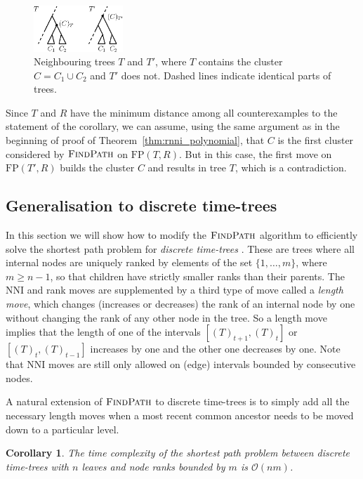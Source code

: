 \documentclass[11pt]{amsart}
\newtheorem{corollary}{Corollary}
\newcommand{\findpath}{\textsc{FindPath}}
\newcommand{\nni}{\mathrm{NNI}}
\newcommand{\fp}{\mathrm{FP}}
\renewcommand{\O}{\mathcal O}
\newcommand{\summary}[1]{} %
\begin{document}
\begin{figure}[ht]
\centering
\includegraphics[width=0.3\textwidth]{cluster_thm_proof}
\caption{Neighbouring trees $T$ and $T'$, where $T$ contains the cluster $C = C_1 \cup C_2$ and $T'$ does not.
Dashed lines indicate identical parts of trees.}
\label{fig:cluster_thm_proof}
\end{figure}

Since $T$ and $R$ have the minimum distance among all counterexamples to the statement of the corollary, we can assume, using the same argument as in the beginning of proof of Theorem~\ref{thm:rnni_polynomial}, that $C$ is the first cluster considered by $\findpath$ on $\fp(T, R)$.
But in this case, the first move on $\fp(T',R)$ builds the cluster $C$ and results in tree $T$, which is a contradiction.
\endproof

\subsection{Generalisation to discrete time-trees}

\summary{Generalising $\findpath$ for discrete time-trees}
In this section we will show how to modify the $\findpath$ algorithm to efficiently solve the shortest path problem for \emph{discrete time-trees} \autocite{Gavryushkin2018-ol}.
These are trees where all internal nodes are uniquely ranked by elements of the set $\{1, \ldots, m\}$, where $m \geq n - 1$, so that children have strictly smaller ranks than their parents.
The NNI and rank moves are supplemented by a third type of move called a \emph{length move}, which changes (increases or decreases) the rank of an internal node by one without changing the rank of any other node in the tree.
So a length move implies that the length of one of the intervals $[(T)_{t+1},(T)_t]$ or $[(T)_t,(T)_{t-1}]$ increases by one and the other one decreases by one.
Note that $\nni$ moves are still only allowed on (edge) intervals bounded by consecutive nodes.

A natural extension of $\findpath$ to discrete time-trees is to simply add all the necessary length moves when a most recent common ancestor needs to be moved down to a particular level.
\begin{corollary}
The time complexity of the shortest path problem between discrete time-trees with $n$ leaves and node ranks bounded by $m$ is $\O(nm)$.
\label{cor:fp_dtt}
\end{corollary}
\end{document}
